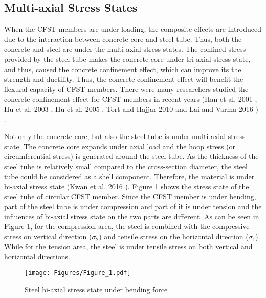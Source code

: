 \documentclass[12pt,a4]{article}
\begin{document}
	\subsection{Multi-axial Stress States}
	When the CFST members are under loading, the composite effects are introduced due to the interaction between concrete core and steel tube. Thus, both the concrete and steel are under the multi-axial stress states. The confined stress provided by the steel tube makes the concrete core under tri-axial stress state, and thus, caused the concrete confinement effect, which can improve its the strength and ductility. Thus, the concrete confinement effect will benefit the flexural capacity of CFST members. There were many researchers studied the concrete confinement effect for CFST members in recent years (Han et al. 2001 \cite{RN23}, Hu et al. 2003 \cite{RN1}, Hu et al. 2005 \cite{RN29}, Tort and Hajjar 2010 \cite{RN46} and Lai and Varma 2016 \cite{RN32}) .
	\par
	Not only the concrete core, but also the steel tube is under multi-axial stress state. The concrete core expands under axial load and the hoop stress (or circumferential stress) is generated around the steel tube. As the thickness of the steel tube is relatively small compared to the cross-section diameter, the steel tube could be considered as a shell component. Therefore, the material is under bi-axial stress state (Kwan et al. 2016 \cite{RN31}). Figure \ref{fig-1} shows the stress state of the steel tube of circular CFST member. Since the CFST member is under bending, part of the steel tube is under compression and part of it is under tension and the influences of bi-axial stress state on the two parts are different. As can be seen in Figure \ref{fig-1}, for the compression area, the steel is combined with the compressive stress on vertical direction ($\sigma_2$) and tensile stress on the horizontal direction ($\sigma_1$). While for the tension area, the steel is under tensile stress on both vertical and horizontal directions.
	\par
	\begin{figure}[h]
		\centering
		\texttt{[image: Figures/Figure\_1.pdf]}
		\caption{Steel bi-axial stress state under bending force}
		\label{fig-1}
	\end{figure}
	\par
\end{document}
